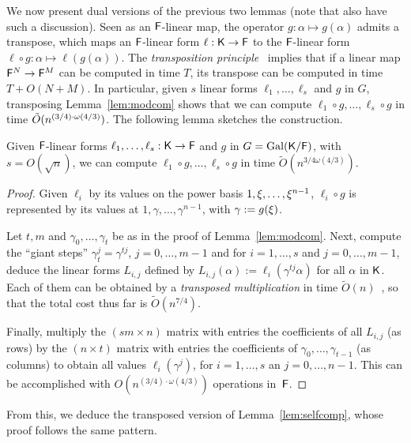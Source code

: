 We now present dual versions of the previous two lemmas (note that
\cite{KalSho98} also have such a discussion). Seen as an ${\mathsf{F}}$-linear
map, the operator $g:\alpha \mapsto g(\alpha)$ admits a transpose,
which maps an ${\mathsf{F}}$-linear form $\ell:{\mathsf{K}}\to{\mathsf{F}}$ to the ${\mathsf{F}}$-linear form
$\ell \circ g: \alpha \mapsto \ell(g(\alpha))$.  The {\em
  transposition principle}~\citep{KaKiBs88,CaKaYa89} implies that if a
linear map ${\mathsf{F}}^N \to {\mathsf{F}}^M$ can be computed in time $T$, its transpose
can be computed in time $T+O(N+M)$. In particular, given $s$ linear
forms $\ell_1,\dots,\ell_s$ and $g$ in $G$, transposing
Lemma~\ref{lem:modcom} shows that we can compute $\ell_1 \circ
g,\dots,\ell_s \circ g$ in time $\tilde{O}(n^{(3/4)\cdot \omega(4/3)})$. The following lemma
sketches the construction.

\begin{lemma}
  \label{lem:modcomT}
  Given ${\mathsf{F}}$-linear forms $\ell_1,\dots,\ell_s:{\mathsf{K}}\to {\mathsf{F}}$ and $g$ in $G =
  \mathrm{Gal}({\mathsf{K}}/{\mathsf{F}})$, with $s = O(\sqrt{n})$, we can compute
  $\ell_1\circ g,\dots,\ell_s \circ g$ in time $\tilde
  O(n^{{3}/{4}\omega({4}/{3})})$.
\end{lemma}
\begin{proof}
  Given $\ell_i$ by its values on the power basis $1,\xi,\dots,\xi^{n-1}$, $\ell_i \circ g$ is represented by its values at
  $1,\gamma,\dots,\gamma^{n-1}$, with $\gamma := g(\xi)$. 

  Let $t,m$ and $\gamma_0,\dots,\gamma_t$ be as in the proof of
  Lemma~\ref{lem:modcom}. Next, compute the ``giant steps''
  $\gamma_t^j = \gamma^{tj}$, $j=0,\dots,m-1$ and for $i=1,\dots,s$
  and $j=0,\dots,m-1$, deduce the linear forms $L_{i,j}$ defined by
  $L_{i,j}(\alpha) := \ell_i(\gamma^{tj}\alpha)$ for all $\alpha$ in
  ${\mathsf{K}}$. Each of them can be obtained by a {\em transposed
    multiplication} in time $\tilde{O}(n)$~\citep[Section~4.1]{Shoup},
  so that the total cost thus far is $\tilde{O}(n^{7/4})$.

  Finally, multiply the $(sm \times n)$ matrix with entries the
  coefficients of all $L_{i,j}$ (as rows) by the $(n \times t)$ matrix with
  entries the coefficients of $\gamma_0,\dots,\gamma_{t-1}$ (as columns) to
  obtain all values $\ell_i(\gamma^j)$, for $i=1,\dots,s$ an
  $j=0,\dots,n-1$.  This can be accomplished with
  $O(n^{(3/4)\cdot\omega(4/3)})$ operations in~${\mathsf{F}}$.
\end{proof}

From this, we deduce the transposed version of Lemma~\ref{lem:selfcomp},
whose proof follows the same pattern.

